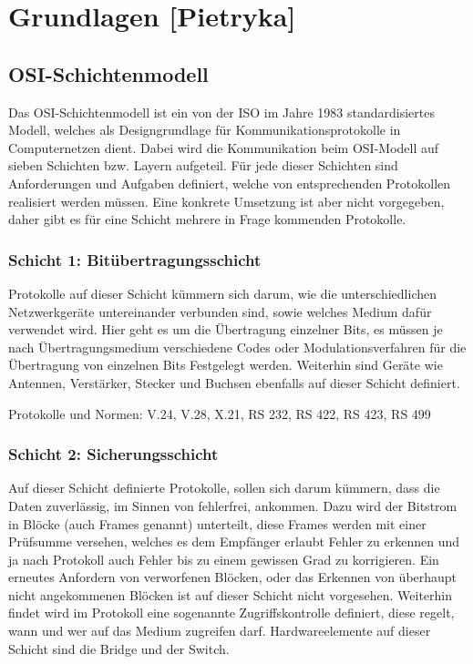 \documentclass[a4paper,14pt,headsepline]{scrartcl}
\begin{document}
\newpage

\section{Grundlagen [Pietryka]}
\subsection{OSI-Schichtenmodell}
Das OSI-Schichtenmodell ist ein von der ISO im Jahre 1983 standardisiertes Modell, welches als Designgrundlage für Kommunikationsprotokolle in Computernetzen dient. Dabei wird die Kommunikation beim OSI-Modell auf sieben Schichten bzw. Layern aufgeteil. Für jede dieser Schichten sind Anforderungen und Aufgaben definiert, welche von entsprechenden Protokollen realisiert werden müssen. Eine konkrete Umsetzung ist aber nicht vorgegeben, daher gibt es für eine Schicht mehrere in Frage kommenden Protokolle.
\subsubsection{Schicht 1: Bitübertragungsschicht}
Protokolle auf dieser Schicht kümmern sich darum, wie die unterschiedlichen Netzwerkgeräte untereinander verbunden sind, sowie welches Medium dafür verwendet wird. Hier geht es um die Übertragung einzelner Bits, es müssen je nach Übertragungsmedium verschiedene Codes oder Modulationsverfahren für die Übertragung von einzelnen Bits Festgelegt werden. Weiterhin sind Geräte wie Antennen, Verstärker, Stecker und Buchsen ebenfalls auf dieser Schicht definiert.

Protokolle und Normen: V.24, V.28, X.21, RS 232, RS 422, RS 423, RS 499

\subsubsection{Schicht 2: Sicherungsschicht}
Auf dieser Schicht definierte Protokolle, sollen sich darum kümmern, dass die Daten zuverlässig, im Sinnen von fehlerfrei, ankommen. Dazu wird der Bitstrom in Blöcke (auch Frames genannt) unterteilt, diese Frames werden mit einer Prüfsumme versehen, welches es dem Empfänger erlaubt Fehler zu erkennen und ja nach Protokoll auch Fehler bis zu einem gewissen Grad zu korrigieren. Ein erneutes Anfordern von verworfenen Blöcken, oder das Erkennen von überhaupt nicht angekommenen Blöcken ist auf dieser Schicht nicht vorgesehen. Weiterhin findet wird im Protokoll eine sogenannte Zugriffskontrolle definiert, diese regelt, wann und wer auf das Medium zugreifen darf. Hardwareelemente auf dieser Schicht sind die Bridge und der Switch.
\end{document}
